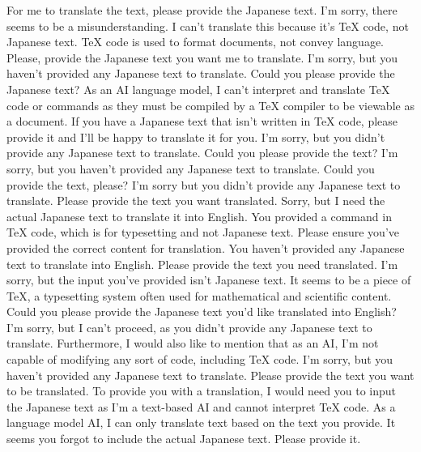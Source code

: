 {%
For me to translate the text, please provide the Japanese text.
I'm sorry, there seems to be a misunderstanding. I can't translate this because it's TeX code, not Japanese text. TeX code is used to format documents, not convey language. Please, provide the Japanese text you want me to translate.
I'm sorry, but you haven't provided any Japanese text to translate. Could you please provide the Japanese text?
As an AI language model, I can't interpret and translate TeX code or commands as they must be compiled by a TeX compiler to be viewable as a document. If you have a Japanese text that isn't written in TeX code, please provide it and I'll be happy to translate it for you.
I'm sorry, but you didn't provide any Japanese text to translate. Could you please provide the text?
I'm sorry, but you haven't provided any Japanese text to translate. Could you provide the text, please?
I'm sorry but you didn't provide any Japanese text to translate. Please provide the text you want translated.
Sorry, but I need the actual Japanese text to translate it into English. You provided a command in TeX code, which is for typesetting and not Japanese text. Please ensure you've provided the correct content for translation.
You haven't provided any Japanese text to translate into English. Please provide the text you need translated.
I'm sorry, but the input you've provided isn't Japanese text. It seems to be a piece of TeX, a typesetting system often used for mathematical and scientific content. Could you please provide the Japanese text you'd like translated into English?
I'm sorry, but I can't proceed, as you didn't provide any Japanese text to translate. Furthermore, I would also like to mention that as an AI, I'm not capable of modifying any sort of code, including TeX code.
I'm sorry, but you haven't provided any Japanese text to translate. Please provide the text you want to be translated.
To provide you with a translation, I would need you to input the Japanese text as I'm a text-based AI and cannot interpret TeX code.
As a language model AI, I can only translate text based on the text you provide. It seems you forgot to include the actual Japanese text. Please provide it.
}
